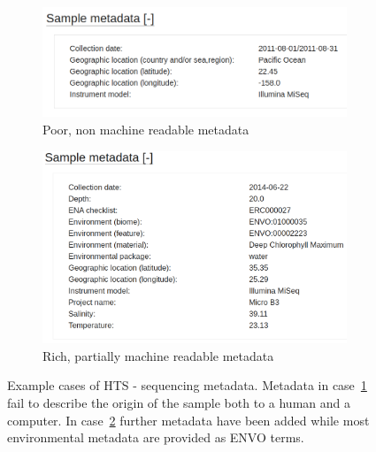       \begin{figure}[!h]

         \centering

         \begin{subfigure}{0.72\textwidth}
           \includegraphics[width=\linewidth]{figures/SRS1753450_metadata.png}
           \caption{Poor, non machine readable metadata} \label{fig:metadata_examples_a}
         \end{subfigure}%
         
         \hspace*{\fill}   %
         
         \begin{subfigure}{0.72\textwidth}
           \includegraphics[width=\linewidth]{figures/ERS667566_metadata.png}
           \caption{Rich, partially machine readable metadata} \label{fig:metadata_examples_b}
         
         \end{subfigure}
       
       \caption[Samples metadata examples MGnify]{Example cases of HTS - sequencing metadata. Metadata in case~\ref{fig:metadata_examples_a} fail to describe 
       the origin of the sample both to a human and a computer. 
       In case~\ref{fig:metadata_examples_b} further metadata have been added 
       while most environmental metadata are provided as ENVO terms. 
       } 
       \label{fig:metadata_examples}
      \end{figure}


